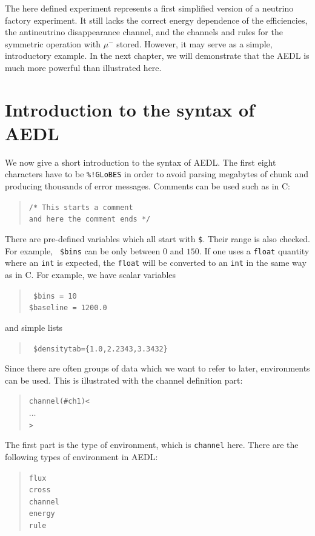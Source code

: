 The here defined experiment represents a first simplified version of a neutrino factory experiment. It still lacks the correct energy dependence of the efficiencies, the antineutrino disappearance channel, and the channels and rules for the symmetric operation with $\mu^-$ stored. However, it may serve as a simple, introductory example. In the next chapter, we will demonstrate that the AEDL is much more powerful than illustrated here.


\section{Introduction to the syntax of AEDL}
\label{sec:syntax}

We now give a short introduction to the syntax of AEDL.
 The first eight characters have to be {\tt \%!GLoBES}
in order to avoid parsing megabytes of chunk
 and producing thousands of error messages. 
%
Comments can be used such as in C:
\begin{quote}
{\tt /* This starts a comment\\
 and here the comment ends */
}
\end{quote}
There are pre-defined variables which all start with {\tt \$}. Their range
is also checked. For example,  {\tt 
\$bins} can be only between $0$ and $150$. If one uses a {\tt float} quantity where  an {\tt int} is expected, the {\tt float} will be converted to an {\tt int} in the same way as in C.  For example, we have scalar variables
\begin{quote}
{\tt
\$bins = 10\\
\$baseline = 1200.0
}
\end{quote}
and simple lists
\begin{quote}
{\tt
\$densitytab=\{1.0,2.2343,3.3432\} 
}
\end{quote}
%
Since there are often groups of data which we want to refer to later,
environments can be used. This is illustrated 
with the channel definition part:
\begin{quote}
{\tt channel(\#ch1)<\\
\tb  $\ldots$\\
>
}
\end{quote}
The first part is the type of environment, which is {\tt channel} here. 
There are the following types of environment in AEDL:
\begin{quote}
{\tt flux\\
cross\\
channel\\
energy\\
rule
}
\end{quote}
